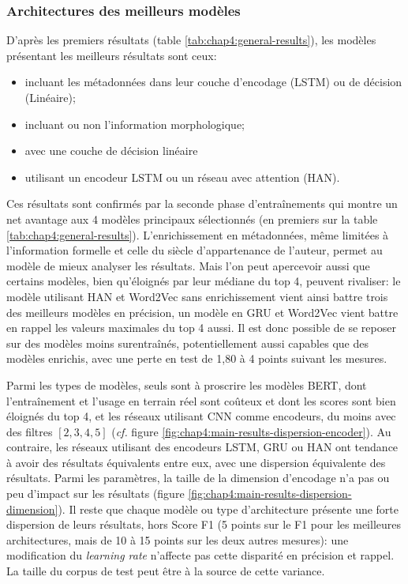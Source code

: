 \subsubsection{Architectures des meilleurs modèles}

D'après les premiers résultats (table \ref{tab:chap4:general-results}), les modèles présentant les meilleurs résultats sont ceux:
\begin{itemize}
    \item incluant les métadonnées dans leur couche d'encodage (LSTM) ou de décision (Linéaire);
    \item incluant ou non l'information morphologique;
    \item avec une couche de décision linéaire
    \item utilisant un encodeur LSTM ou un réseau avec attention (HAN).
\end{itemize}

Ces résultats sont confirmés par la seconde phase d'entraînements qui montre un net avantage aux 4 modèles principaux sélectionnés (en premiers sur la table \ref{tab:chap4:general-results}). L'enrichissement en métadonnées, même limitées à l'information formelle et celle du siècle d'appartenance de l'auteur, permet au modèle de mieux analyser les résultats. Mais l'on peut apercevoir aussi que certains modèles, bien qu'éloignés par leur médiane du top 4, peuvent rivaliser: le modèle utilisant HAN et Word2Vec sans enrichissement vient ainsi battre trois des meilleurs modèles en précision, un modèle en GRU et Word2Vec vient battre en rappel les valeurs maximales du top 4 aussi. Il est donc possible de se reposer sur des modèles moins surentraînés, potentiellement aussi capables que des modèles enrichis, avec une perte en test de 1,80 à 4 points suivant les mesures.

Parmi les types de modèles, seuls sont à proscrire les modèles BERT, dont l'entraînement et l'usage en terrain réel sont coûteux et dont les scores sont bien éloignés du top 4, et les réseaux utilisant CNN comme encodeurs, du moins avec des filtres $[2,3,4,5]$ (\textit{cf.} figure \ref{fig:chap4:main-results-dispersion-encoder}). Au contraire, les réseaux utilisant des encodeurs LSTM, GRU ou HAN ont tendance à avoir des résultats équivalents entre eux, avec une dispersion équivalente des résultats. Parmi les paramètres, la taille de la dimension d'encodage n'a pas ou peu d'impact sur les résultats (figure \ref{fig:chap4:main-results-dispersion-dimension}). Il reste que chaque modèle ou type d'architecture présente une forte dispersion de leurs résultats, hors Score F1 (5 points sur le F1 pour les meilleures architectures, mais de 10 à 15 points sur les deux autres mesures): une modification du \textit{learning rate} n'affecte pas cette disparité en précision et rappel. La taille du corpus de test peut être à la source de cette variance.

